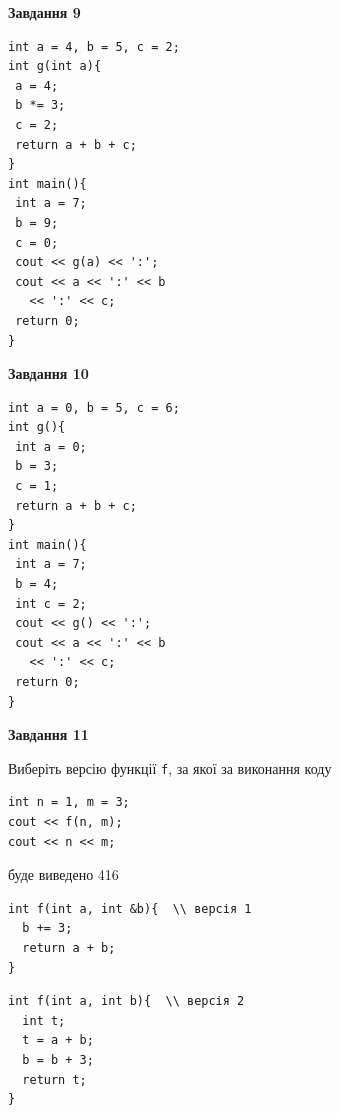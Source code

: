 \documentclass[12pt, ukrainian]{article}
\def\code#1{\Verb!#1!}
\begin{document}
{\begin {large}
\begin{minipage}[t]{11.0cm}
\end{minipage}


\begin{minipage}[t]{7.0cm}

\begin{center}
\textbf{Завдання 9}
\end{center}
\vspace{-8mm}

\begin{verbatim}
int a = 4, b = 5, c = 2;
int g(int a){
 a = 4;
 b *= 3;
 c = 2;
 return a + b + c;
}
int main(){
 int a = 7;
 b = 9;
 c = 0;
 cout << g(a) << ':';
 cout << a << ':' << b 
   << ':' << c;
 return 0;
}
\end{verbatim}



\begin{center}
\textbf{Завдання 10}
\end{center}
\vspace{-8mm}

\begin{verbatim}
int a = 0, b = 5, c = 6;
int g(){
 int a = 0;
 b = 3;
 c = 1;
 return a + b + c;
}
int main(){
 int a = 7;
 b = 4;
 int c = 2;
 cout << g() << ':';
 cout << a << ':' << b 
   << ':' << c;
 return 0;
}
\end{verbatim}

\end{minipage}
\vline \hspace{1mm}
\begin{minipage}[t]{11.0cm}

\begin{center}
\textbf{Завдання 11}
\end{center}
Виберіть версію функції \code{f}, за якої за виконання коду
\begin{verbatim}
int n = 1, m = 3;
cout << f(n, m);
cout << n << m;
\end{verbatim}

буде виведено 416

\begin{verbatim}
int f(int a, int &b){  \\ версія 1
  b += 3;
  return a + b;
}
\end{verbatim}

\vspace{-8mm}\begin{verbatim}
int f(int a, int b){  \\ версія 2
  int t;
  t = a + b;
  b = b + 3;
  return t;
}
\end{verbatim}


\end{minipage}
\end{large}}
\end{document}
